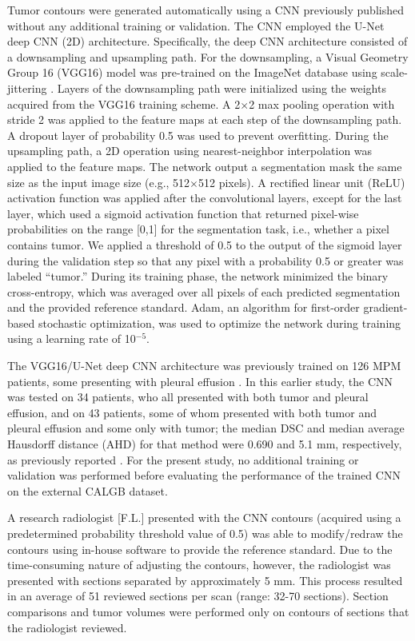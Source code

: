 \documentclass{article}
\begin{document}
Tumor contours were generated automatically using a CNN previously published \cite{EG2} without any additional training or validation. The CNN employed the U-Net deep CNN (2D) architecture. Specifically, the deep CNN architecture consisted of a downsampling and upsampling path. For the downsampling, a Visual Geometry Group 16 (VGG16) model was pre-trained on the ImageNet database using scale-jittering \cite{UNet, VeryDeep}. Layers of the downsampling path were initialized using the weights acquired from the VGG16 training scheme. A 2$\times$2 max pooling operation with stride 2 was applied to the feature maps at each step of the downsampling path. A dropout layer of probability 0.5 was used to prevent overfitting. During the upsampling path, a 2D operation using nearest-neighbor interpolation was applied to the feature maps. The network output a segmentation mask the same size as the input image size (e.g., 512$\times$512 pixels). A rectified linear unit (ReLU) activation function was applied after the convolutional layers, except for the last layer, which used a sigmoid activation function that returned pixel-wise probabilities on the range [0,1] for the segmentation task, i.e., whether a pixel contains tumor. We applied a threshold of 0.5 to the output of the sigmoid layer during the validation step so that any pixel with a probability 0.5 or greater was labeled ``tumor.'' During its training phase, the network minimized the binary cross-entropy, which was averaged over all pixels of each predicted segmentation and the provided reference standard. Adam, an algorithm for first-order gradient-based stochastic optimization, was used to optimize the network during training using a learning rate of 10$^{-5}$. 

The VGG16/U-Net deep CNN architecture was previously trained on 126 MPM patients, some presenting with pleural effusion \cite{EG2}. In this earlier study, the CNN was tested on 34 patients, who all presented with both tumor and pleural effusion, and on 43 patients, some of whom presented with both tumor and pleural effusion and some only with tumor; the median DSC and median average Hausdorff distance (AHD) for that method were 0.690 and 5.1 mm, respectively, as previously reported \cite{EG1}. For the present study, no additional training or validation was performed before evaluating the performance of the trained CNN on the external CALGB dataset.  

A research radiologist [F.L.] presented with the CNN contours (acquired using a predetermined probability threshold value of 0.5) was able to modify/redraw the contours using in-house software to provide the reference standard. Due to the time-consuming nature of adjusting the contours, however, the radiologist was presented with sections separated by approximately 5 mm. This process resulted in an average of 51 reviewed sections per scan (range: 32-70 sections). Section comparisons and tumor volumes were performed only on contours of sections that the radiologist reviewed. 
\end{document}
